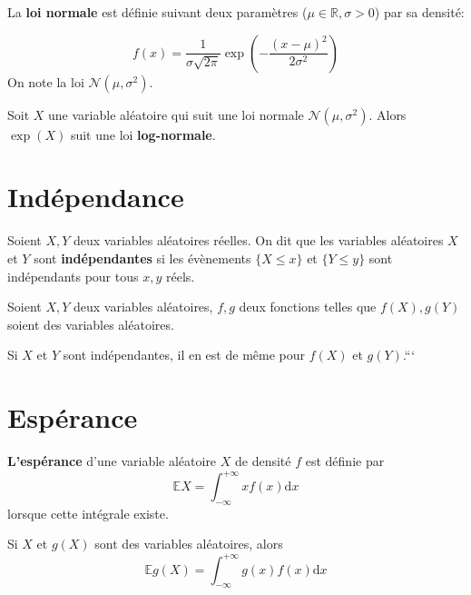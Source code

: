 \documentclass[]{book}
\theoremstyle{definition}
\theoremstyle{definition}
\theoremstyle{definition}
\theoremstyle{remark}
\let\BeginKnitrBlock\begin \let\EndKnitrBlock\end
\begin{document}
\BeginKnitrBlock{example}
\protect\hypertarget{exm:unnamed-chunk-45}{}{\label{exm:unnamed-chunk-45} }La \textbf{loi normale} est définie suivant deux paramètres (\(\mu \in \mathbb{R}, \sigma >0\)) par sa densité:

\[
  f(x) = \frac{1}{\sigma \sqrt{2 \pi}} \exp \left(-\frac{(x-\mu)^2}{2 \sigma^2}\right)
  \]
On note la loi \(\mathcal{N}(\mu,\sigma^2)\).
\EndKnitrBlock{example}

\BeginKnitrBlock{example}
\protect\hypertarget{exm:unnamed-chunk-46}{}{\label{exm:unnamed-chunk-46} }Soit \(X\) une variable aléatoire qui suit une loi normale \(\mathcal{N}(\mu,\sigma^2)\). Alors \(\exp(X)\) suit une loi \textbf{log-normale}.
\EndKnitrBlock{example}

\hypertarget{induxe9pendance-2}{%
\section{Indépendance}\label{induxe9pendance-2}}

\BeginKnitrBlock{definition}
\protect\hypertarget{def:unnamed-chunk-47}{}{\label{def:unnamed-chunk-47} }Soient \(X,Y\) deux variables aléatoires réelles.
On dit que les variables aléatoires \(X\) et \(Y\) sont \textbf{indépendantes} si les évènements \(\lbrace X \leq x \rbrace\) et \(\lbrace Y \leq y \rbrace\) sont indépendants pour tous \(x,y\) réels.
\EndKnitrBlock{definition}

\BeginKnitrBlock{theorem}
\protect\hypertarget{thm:unnamed-chunk-48}{}{\label{thm:unnamed-chunk-48} }Soient \(X,Y\) deux variables aléatoires, \(f,g\) deux fonctions telles que \(f(X), g(Y)\) soient des variables aléatoires.

Si \(X\) et \(Y\) sont indépendantes, il en est de même pour \(f(X)\) et \(g(Y)\).```

\hypertarget{espuxe9rance-1}{%
\section{Espérance}\label{espuxe9rance-1}}
\EndKnitrBlock{theorem}

\BeginKnitrBlock{definition}
\protect\hypertarget{def:unnamed-chunk-49}{}{\label{def:unnamed-chunk-49} }\textbf{L'espérance} d'une variable aléatoire \(X\) de densité \(f\) est définie par
\[\mathbb{E}X = \int_{-\infty}^{+\infty} x f(x) \mbox{d}x\]
lorsque cette intégrale existe.
\EndKnitrBlock{definition}

\BeginKnitrBlock{theorem}
\protect\hypertarget{thm:unnamed-chunk-50}{}{\label{thm:unnamed-chunk-50} }Si \(X\) et \(g(X)\) sont des variables aléatoires, alors
\[\mathbb{E}g(X) = \int_{-\infty}^{+\infty} g(x) f(x) \mbox{d}x\]
\EndKnitrBlock{theorem}
\end{document}
